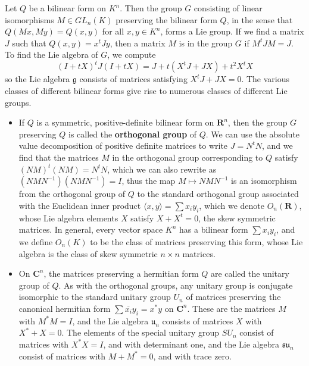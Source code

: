\begin{example}
    Let $Q$ be a bilinear form on $K^n$. Then the group $G$ consisting of linear isomorphisms $M \in GL_n(K)$ preserving the bilinear form $Q$, in the sense that $Q(Mx,My) = Q(x,y)$ for all $x,y \in K^n$, forms a Lie group. If we find a matrix $J$ such that $Q(x,y) = x^tJy$, then a matrix $M$ is in the group $G$ if $M^tJM = J$. To find the Lie algebra of $G$, we compute
    \[ (I + tX)^tJ(I + tX) = J + t(X^tJ + JX) + t^2 X^tX \]
    so the Lie algebra $\mathfrak{g}$ consists of matrices satisfying $X^tJ + JX = 0$. The various classes of different bilinear forms give rise to numerous classes of different Lie groups.
    \begin{itemize}
        \item If $Q$ is a symmetric, positive-definite bilinear form on $\mathbf{R}^n$, then the group $G$ preserving $Q$ is called the {\bf orthogonal group} of $Q$. We can use the absolute value decomposition of positive definite matrices to write $J = N^tN$, and we find that the matrices $M$ in the orthogonal group corresponding to $Q$ satisfy $(NM)^t(NM) = N^tN$, which we can also rewrite as $(NMN^{-1})(NMN^{-1}) = I$, thus the map $M \mapsto NMN^{-1}$ is an isomorphism from the orthogonal group of $Q$ to the standard orthogonal group associated with the Euclidean inner product $\langle x, y \rangle = \sum x_i y_i$, which we denote $O_n(\mathbf{R})$, whose Lie algebra elements $X$ satisfy $X + X^t = 0$, the skew symmetric matrices. In general, every vector space $K^n$ has a bilinear form $\sum x_i y_i$, and we define $O_n(K)$ to be the class of matrices preserving this form, whose Lie algebra is the class of skew symmetric $n \times n$ matrices.

        \item On $\mathbf{C}^n$, the matrices preserving a hermitian form $Q$ are called the unitary group of $Q$. As with the orthogonal groups, any unitary group is conjugate isomorphic to the standard unitary group $U_n$ of matrices preserving the canonical hermitian form $\sum \overline{x_i} y_i = x^*y$ on $\mathbf{C}^n$. These are the matrices $M$ with $M^*M = I$, and the Lie algebra $\mathfrak{u}_n$ consists of matrices $X$ with $X^* + X = 0$. The elements of the special unitary group $SU_n$ consist of matrices with $X^*X = I$, and with determinant one, and the Lie algebra $\mathfrak{su}_n$ consist of matrices with $M + M^* = 0$, and with trace zero.


\end{itemize}
\end{example}
